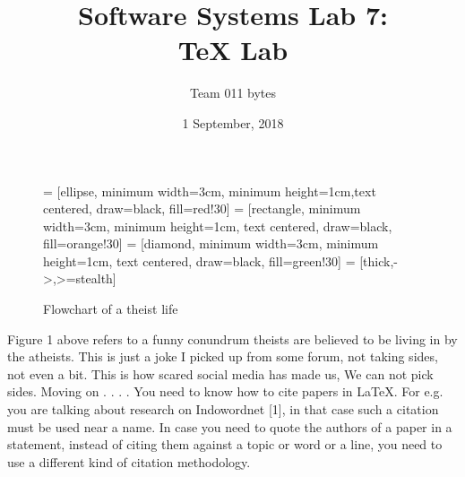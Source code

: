 \documentclass[14pt]{extarticle}
\title{\huge{\textbf{Software Systems Lab 7:\\TeX Lab}}}
\author{\Large{Team 011 bytes}}
\date{\Large{1 September, 2018}}
\begin{document}
\maketitle
\thispagestyle{empty}
\clearpage
{}
\begin{figure}
\begin{center}
 = [ellipse, minimum width=3cm, minimum height=1cm,text centered, draw=black, fill=red!30]
 = [rectangle, minimum width=3cm, minimum height=1cm, text centered, draw=black, fill=orange!30]
 = [diamond, minimum width=3cm, minimum height=1cm, text centered, draw=black, fill=green!30]
 = [thick,->,>=stealth]

\caption{Flowchart of a theist life}
\end{center}
\end{figure}

Figure 1 above refers to a funny conundrum theists are believed to be
living in by the atheists. This is just a joke I picked up from some forum,
not taking sides, not even a bit. This is how scared social media has made
us, We can not pick sides. Moving on . . . . You need to know how to cite
papers in \LaTeX. For e.g. you are talking about research on Indowordnet
[1], in that case such a citation must be used near a name. In case you
need to quote the authors of a paper in a statement, instead of citing them
against a topic or word or a line, you need to use a different kind of citation
methodology.
\end{document}
